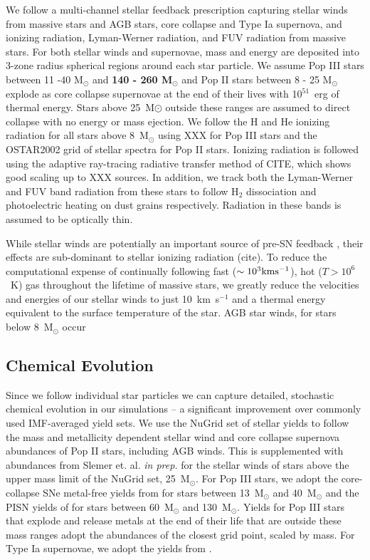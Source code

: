 \documentclass[12pt]{article} %
\begin{document}
We follow a multi-channel stellar feedback prescription capturing stellar winds from massive stars and AGB stars, core collapse and Type Ia supernova, and ionizing radiation, Lyman-Werner radiation, and FUV radiation from massive stars. For both stellar winds and supernovae, mass and energy are deposited into 3-zone radius spherical regions around each star particle. We assume Pop III stars between 11 -40 M$_{\odot}$ and \textbf{ 140 - 260 M$_{\odot}$ } and Pop II stars between 8 - 25 M$_{\odot}$ explode as core collapse supernovae at the end of their lives with 10$^{51}$~erg of thermal energy. Stars above 25~M${\odot}$ outside these ranges are assumed to direct collapse with no energy or mass ejection. We follow the H and He ionizing radiation for all stars above 8~M$_{\odot}$ using XXX for Pop III stars and the OSTAR2002 \citep{Lanz2003} grid of stellar spectra for Pop II stars. Ionizing radiation is followed using the adaptive ray-tracing radiative transfer method of CITE, which shows good scaling up to XXX sources. In addition, we track both the Lyman-Werner and FUV band radiation from these stars to follow H$_2$ dissociation and photoelectric heating on dust grains respectively. Radiation in these bands is assumed to be optically thin.

While stellar winds are potentially an important source of pre-SN feedback \citep{Agertz2013}, their effects are sub-dominant to stellar ionizing radiation (cite). To reduce the computational expense of continually following fast ($\sim 10^{3} \rm{km} \rm{s}^{-1}$), hot ($T > 10^{6}$~K) gas throughout the lifetime of massive stars, we greatly reduce the velocities and energies of our stellar winds to just 10~km~s$^{-1}$ and a thermal energy equivalent to the surface temperature of the star. AGB star winds, for stars below 8~M$_{\odot}$ occur

\subsection{Chemical Evolution}

Since we follow individual star particles we can capture detailed, stochastic chemical evolution in our simulations -- a significant improvement over commonly used IMF-averaged yield sets. We use the NuGrid set of stellar yields \citep{Pignatari2016,Ritter2018} to follow the mass and metallicity dependent stellar wind and core collapse supernova abundances of Pop II stars, including AGB winds. This is supplemented with abundances from Slemer et. al. \textit{in prep.} for the stellar winds of stars above the upper mass limit of the NuGrid set, 25~M$_{\odot}$. For Pop III stars, we adopt the core-collapse SNe metal-free yields from \cite{Nomoto2006} for stars between 13~M$_{\odot}$ and 40~M$_{\odot}$ and the PISN yields of \cite{HegerWoosley2002} for stars between 60~M$_{\odot}$ and 130~M$_{\odot}$. Yields for Pop III stars that explode and release metals at the end of their life that are outside these mass ranges adopt the abundances of the closest grid point, scaled by mass. For Type Ia supernovae, we adopt the yields from \cite{NomoYokoi1986}.
\end{document}
